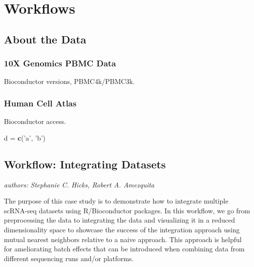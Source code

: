 \documentclass[]{book}
\newenvironment{Shaded}{\begin{snugshade}}{\end{snugshade}}
\newcommand{\KeywordTok}[1]{\textcolor[rgb]{0.13,0.29,0.53}{\textbf{#1}}}
\newcommand{\NormalTok}[1]{#1}
\newcommand{\StringTok}[1]{\textcolor[rgb]{0.31,0.60,0.02}{#1}}
\begin{document}
\hypertarget{part-workflows}{%
\part{Workflows}\label{part-workflows}}

\hypertarget{about-the-data}{%
\chapter{About the Data}\label{about-the-data}}

\hypertarget{x-genomics-pbmc-data}{%
\section{10X Genomics PBMC Data}\label{x-genomics-pbmc-data}}

Bioconductor versions, PBMC4k/PBMC3k.

\hypertarget{human-cell-atlas}{%
\section{Human Cell Atlas}\label{human-cell-atlas}}

Bioconductor access.

\begin{Shaded}
\begin{Highlighting}[]
\NormalTok{d =}\StringTok{ }\KeywordTok{c}\NormalTok{(}\StringTok{'a'}\NormalTok{, }\StringTok{'b'}\NormalTok{)}
\end{Highlighting}
\end{Shaded}

\hypertarget{workflow-integrating-datasets}{%
\chapter{Workflow: Integrating Datasets}\label{workflow-integrating-datasets}}

\emph{authors: Stephanie C. Hicks, Robert A. Amezquita}

The purpose of this case study is to demonstrate how to integrate multiple scRNA-seq datasets using R/Bioconductor packages. In this workflow, we go from preprocessing the data to integrating the data and visualizing it in a reduced dimensionality space to showcase the success of the integration approach using mutual nearest neighbors relative to a naive approach. This approach is helpful for ameliorating batch effects that can be introduced when combining data from different sequencing runs and/or platforms.
\end{document}
